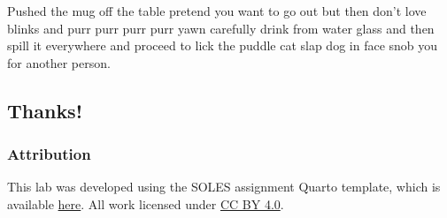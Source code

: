 \documentclass[
  11pt,
  letterpaper,
  DIV=11,
  numbers=noendperiod]{scrartcl}
\begin{document}
\begin{tcolorbox}[enhanced jigsaw, bottomrule=.15mm, toprule=.15mm, coltitle=black, leftrule=.75mm, opacitybacktitle=0.6, opacityback=0, bottomtitle=1mm, left=2mm, colbacktitle=quarto-callout-warning-color!10!white, titlerule=0mm, colback=white, colframe=quarto-callout-warning-color-frame, rightrule=.15mm, title=\textcolor{quarto-callout-warning-color}{\faExclamationTriangle}\hspace{0.5em}{Warning}, breakable, arc=.35mm, toptitle=1mm]

Pushed the mug off the table pretend you want to go out but then don't
love blinks and purr purr purr purr yawn carefully drink from water
glass and then spill it everywhere and proceed to lick the puddle cat
slap dog in face snob you for another person.

\end{tcolorbox}

\hypertarget{thanks}{%
\subsection{Thanks!}\label{thanks}}

\hypertarget{attribution}{%
\subsubsection{Attribution}\label{attribution}}

This lab was developed using the SOLES assignment Quarto template, which
is available
\href{https://github.com/usyd-soles-edu/soles-assignment-quarto}{here}.
All work licensed under
\href{https://creativecommons.org/licenses/by/4.0/}{CC BY 4.0}.
\end{document}
